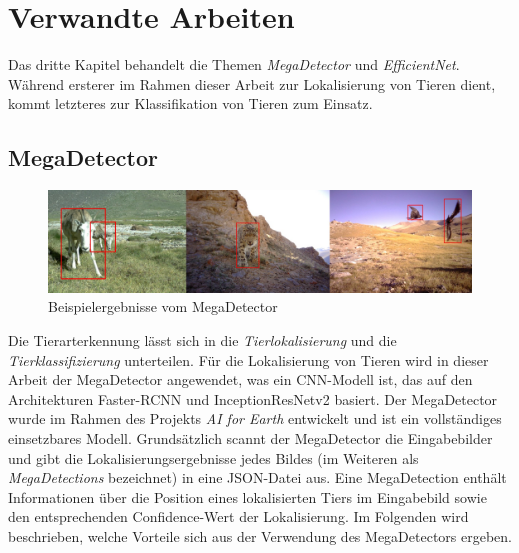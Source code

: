 \chapter{Verwandte Arbeiten} \label{chap:relatedwork}

Das dritte Kapitel behandelt die Themen \emph{MegaDetector} und \emph{EfficientNet}. Während ersterer im Rahmen dieser Arbeit zur Lokalisierung von Tieren dient, kommt letzteres zur Klassifikation von Tieren zum Einsatz. 

\section{MegaDetector} \label{sec:megadetector}

\begin{figure}[!hb]
	\centering
	\includegraphics[width=\linewidth]{images/Megadetector example}
	\caption{Beispielergebnisse vom MegaDetector \protect\cite{beery2019efficient}}
	\label{fig:Megadetectorexample}
\end{figure}

Die Tierarterkennung lässt sich in die \emph{Tierlokalisierung} und die \emph{Tierklassifizierung} unterteilen. Für die Lokalisierung von Tieren wird in dieser Arbeit der MegaDetector \cite{beery2019efficient} angewendet, was ein CNN-Modell ist, das auf den Architekturen Faster-RCNN \cite{ren2016faster} und InceptionResNetv2 \cite{szegedy2016inceptionv4} basiert. Der MegaDetector wurde im Rahmen des Projekts \emph{AI for Earth} entwickelt und ist ein vollständiges einsetzbares Modell. Grundsätzlich scannt der MegaDetector die Eingabebilder und gibt die Lokalisierungsergebnisse jedes Bildes (im Weiteren als \emph{MegaDetections} bezeichnet) in eine JSON-Datei aus. Eine MegaDetection enthält Informationen über die Position eines lokalisierten Tiers im Eingabebild sowie den entsprechenden Confidence-Wert der Lokalisierung. Im Folgenden wird beschrieben, welche Vorteile sich aus der Verwendung des MegaDetectors ergeben.

